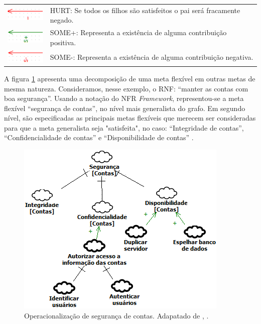 \begin{table}[h!]
\begin{tabular}{|l|l|}
		\multirow{2}{*}{\includegraphics[scale=0.9]{figuras/Hurt.png}} & \multirow{2}{*}{HURT: Se todos os filhos são satisfeitos o pai será fracamente negado.} \\
		&  \\ \hline
		\multirow{2}{*}{\includegraphics[scale=0.9]{figuras/SomeMais.png}} & \multirow{2}{*}{SOME+: Representa a existência de alguma contribuição positiva.} \\
		&  \\ \hline
		\multirow{2}{*}{\includegraphics[scale=0.9]{figuras/SomeMenos.png}} & \multirow{2}{*}{SOME-: Representa a existência de alguma contribuição negativa.} \\
		&  \\ \hline
	\end{tabular}
\end{table}

A figura \ref{exemploNFR} apresenta uma decomposição de uma meta flexível em outras metas de mesma natureza. Consideramos, nesse exemplo, o RNF: “manter as contas com boa segurança”. Usando a notação do NFR \textit{Framework}, representou-se a meta flexível  “segurança de contas”, no nível mais generalista do grafo. Em segundo nível, são especificadas as principais metas flexíveis que merecem ser consideradas para que a meta generalista seja "satisfeita", no caso: “Integridade de contas”, “Confidencialidade de contas” e “Disponibilidade de contas” \cite{chung2012non}.

\pagebreak

\begin{figure}[h!]
	\centering
	\includegraphics[keepaspectratio=true,scale=1.0]{figuras/exemploNFR.png}
	\caption{Operacionalização de segurança de contas. Adapatado de \cite{chung2012non}, \cite{affleck2012supporting}.}
	\label{exemploNFR}
\end{figure} 

